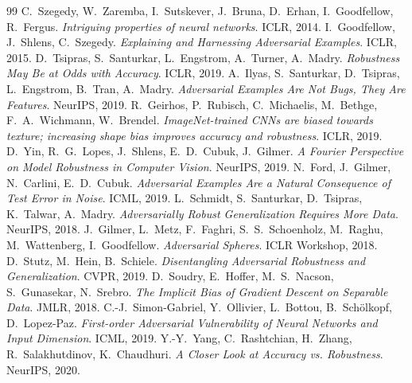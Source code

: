 \documentclass[11pt]{article}
\begin{document}
\begin{thebibliography}{99}
 C.~Szegedy, W.~Zaremba, I.~Sutskever, J.~Bruna, D.~Erhan, I.~Goodfellow, R.~Fergus. \emph{Intriguing properties of neural networks}. ICLR, 2014.
 I.~Goodfellow, J.~Shlens, C.~Szegedy. \emph{Explaining and Harnessing Adversarial Examples}. ICLR, 2015.
 D.~Tsipras, S.~Santurkar, L.~Engstrom, A.~Turner, A.~Madry. \emph{Robustness May Be at Odds with Accuracy}. ICLR, 2019.
 A.~Ilyas, S.~Santurkar, D.~Tsipras, L.~Engstrom, B.~Tran, A.~Madry. \emph{Adversarial Examples Are Not Bugs, They Are Features}. NeurIPS, 2019.
 R.~Geirhos, P.~Rubisch, C.~Michaelis, M.~Bethge, F.~A.~Wichmann, W.~Brendel. \emph{ImageNet-trained CNNs are biased towards texture; increasing shape bias improves accuracy and robustness}. ICLR, 2019.
 D.~Yin, R.~G.~Lopes, J.~Shlens, E.~D.~Cubuk, J.~Gilmer. \emph{A Fourier Perspective on Model Robustness in Computer Vision}. NeurIPS, 2019.
 N.~Ford, J.~Gilmer, N.~Carlini, E.~D.~Cubuk. \emph{Adversarial Examples Are a Natural Consequence of Test Error in Noise}. ICML, 2019.
 L.~Schmidt, S.~Santurkar, D.~Tsipras, K.~Talwar, A.~Madry. \emph{Adversarially Robust Generalization Requires More Data}. NeurIPS, 2018.
 J.~Gilmer, L.~Metz, F.~Faghri, S.~S.~Schoenholz, M.~Raghu, M.~Wattenberg, I.~Goodfellow. \emph{Adversarial Spheres}. ICLR Workshop, 2018.
 D.~Stutz, M.~Hein, B.~Schiele. \emph{Disentangling Adversarial Robustness and Generalization}. CVPR, 2019.
 D.~Soudry, E.~Hoffer, M.~S.~Nacson, S.~Gunasekar, N.~Srebro. \emph{The Implicit Bias of Gradient Descent on Separable Data}. JMLR, 2018.
 C.-J.~Simon-Gabriel, Y.~Ollivier, L.~Bottou, B.~Sch\"olkopf, D.~Lopez-Paz. \emph{First-order Adversarial Vulnerability of Neural Networks and Input Dimension}. ICML, 2019.
 Y.-Y.~Yang, C.~Rashtchian, H.~Zhang, R.~Salakhutdinov, K.~Chaudhuri. \emph{A Closer Look at Accuracy vs. Robustness}. NeurIPS, 2020.
\end{thebibliography}
\end{document}
